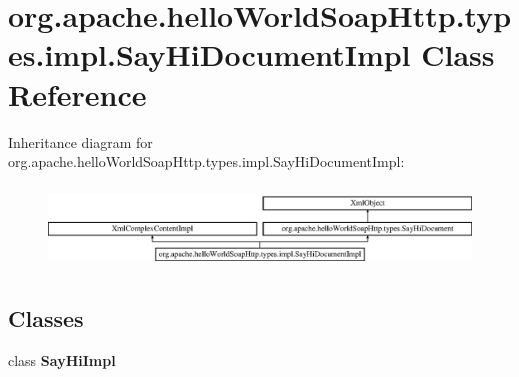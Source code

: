 \hypertarget{classorg_1_1apache_1_1hello_world_soap_http_1_1types_1_1impl_1_1_say_hi_document_impl}{}\section{org.\+apache.\+hello\+World\+Soap\+Http.\+types.\+impl.\+Say\+Hi\+Document\+Impl Class Reference}
\label{classorg_1_1apache_1_1hello_world_soap_http_1_1types_1_1impl_1_1_say_hi_document_impl}
Inheritance diagram for org.\+apache.\+hello\+World\+Soap\+Http.\+types.\+impl.\+Say\+Hi\+Document\+Impl\+:\begin{figure}[H]
\begin{center}
\leavevmode
\includegraphics[height=2.234043cm]{classorg_1_1apache_1_1hello_world_soap_http_1_1types_1_1impl_1_1_say_hi_document_impl}
\end{center}
\end{figure}
\subsection*{Classes}
\begin{DoxyCompactItemize}
\item 
class {\bfseries Say\+Hi\+Impl}
\end{DoxyCompactItemize}
